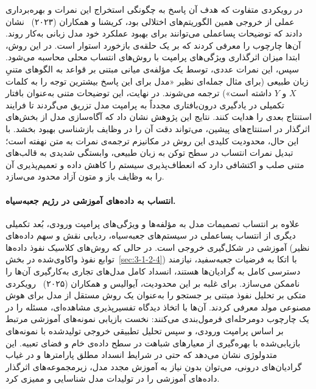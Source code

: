 در رویکردی متفاوت که هدف آن پاسخ به چگونگی استخراج این نمرات و بهره‌برداری عملی از خروجی همین الگوریتم‌های اختلالی بود، کریشنا و همکاران (۲۰۲۳)~\cite{krishna2023post} نشان دادند که توضیحات پساعملی می‌توانند برای بهبود عملکرد خود مدل زبانی به‌کار روند. آن‌ها چارچوب  را معرفی کردند که بر یک حلقه‌ی بازخورد استوار است. در این روش، ابتدا میزان اثرگذاری ویژگی‌های پرامپت با روش‌های انتساب محلی محاسبه می‌شود. سپس، این نمرات عددی، توسط یک مؤلفه‌ی میانی مبتنی بر قواعد به الگوهای متنیِ زبان طبیعی (برای مثال جمله‌ای نظیر «مدل برای این پاسخ بیشترین توجه را به کلمات $X$ و $Y$ داشته است») ترجمه می‌شوند. در نهایت، این توضیحات متنی به‌عنوان بافتار تکمیلی در یادگیری درون‌بافتاری مجدداً به پرامپت مدل تزریق می‌گردند تا فرایند استنتاج بعدی را هدایت کنند. نتایج این پژوهش نشان داد که آگاه‌سازی مدل از بخش‌های اثرگذار در استنتاج‌های پیشین، می‌تواند دقت آن را در وظایف بازشناسی بهبود بخشد. با این حال، محدودیت کلیدی این روش در مکانیزم ترجمه‌ی نمرات به متن نهفته است؛ تبدیل نمرات انتساب در سطح توکن به زبان طبیعی، وابستگی شدیدی به قالب‌های متنی صلب و اکتشافی دارد که انعطاف‌پذیری سیستم را کاهش داده و تعمیم‌پذیری آن را به وظایف باز و متون آزاد محدود می‌سازد.

\paragraph{انتساب به داده‌های آموزشی در رژیم جعبه‌سیاه.}

علاوه بر انتساب تصمیمات مدل به مؤلفه‌ها و ویژگی‌های پرامپت ورودی، بُعد تکمیلی دیگری از انتساب پساعملی در سیستم‌های جعبه‌سیاه، ردیابی نقش و سهم داده‌های آموزشی در شکل‌گیری خروجی است. در حالی که روش‌های کلاسیک نفوذ داده‌ها (نظیر توابع نفوذ واکاوی‌شده در بخش~\ref{sec:3-1-2-4}) با اتکا به فرضیات جعبه‌سفید، نیازمند دسترسی کامل به گرادیان‌ها هستند، انسداد کامل مدل‌های تجاری به‌کارگیری آن‌ها را ناممکن می‌سازد. برای غلبه بر این محدودیت، آیوالیس و همکاران (۲۰۲۵)~\cite{aivalis2025enhancing} رویکردی متکی بر تحلیل نفوذ مبتنی بر جستجو را به‌عنوان یک روش مستقل از مدل برای هوش مصنوعی مولد معرفی کردند. آن‌ها با اتخاذ دیدگاه تفسیرپذیری مشاهده‌ای، مسئله را در یک چارچوب دومرحله‌ای فرمول‌بندی می‌کنند: نخست بازیابی نمونه‌های آموزشی مرتبط بر اساس پرامپت ورودی، و سپس تحلیل تطبیقی خروجی تولیدشده با نمونه‌های بازیابی‌شده با بهره‌گیری از معیارهای شباهت در سطح داده‌ی خام و فضای تعبیه. این متدولوژی نشان می‌دهد که حتی در شرایط انسداد مطلق پارامترها و در غیاب گرادیان‌های درونی، می‌توان بدون نیاز به آموزش مجدد مدل، زیرمجموعه‌های اثرگذار داده‌های آموزشی را در تولیدات مدل شناسایی و ممیزی کرد.


